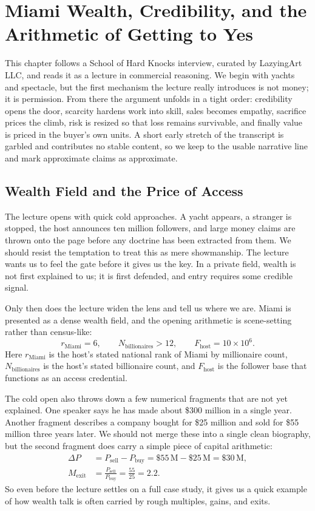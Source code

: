 \chapter{Miami Wealth, Credibility, and the Arithmetic of Getting to Yes}

This chapter follows a School of Hard Knocks interview, curated by LazyingArt LLC, and reads it as a lecture in commercial reasoning. We begin with yachts and spectacle, but the first mechanism the lecture really introduces is not money; it is permission. From there the argument unfolds in a tight order: credibility opens the door, scarcity hardens work into skill, sales becomes empathy, sacrifice prices the climb, risk is resized so that loss remains survivable, and finally value is priced in the buyer's own units. A short early stretch of the transcript is garbled and contributes no stable content, so we keep to the usable narrative line and mark approximate claims as approximate.

\section{Wealth Field and the Price of Access}

The lecture opens with quick cold approaches. A yacht appears, a stranger is stopped, the host announces ten million followers, and large money claims are thrown onto the page before any doctrine has been extracted from them. We should resist the temptation to treat this as mere showmanship. The lecture wants us to feel the gate before it gives us the key. In a private field, wealth is not first explained to us; it is first defended, and entry requires some credible signal.

Only then does the lecture widen the lens and tell us where we are. Miami is presented as a dense wealth field, and the opening arithmetic is scene-setting rather than census-like:
\begin{equation}
r_{\mathrm{Miami}} = 6,
\qquad
N_{\mathrm{billionaires}} > 12,
\qquad
F_{\mathrm{host}} = 10\times 10^{6}.
\end{equation}
Here \(r_{\mathrm{Miami}}\) is the host's stated national rank of Miami by millionaire count, \(N_{\mathrm{billionaires}}\) is the host's stated billionaire count, and \(F_{\mathrm{host}}\) is the follower base that functions as an access credential.

The cold open also throws down a few numerical fragments that are not yet explained. One speaker says he has made about \$300 million in a single year. Another fragment describes a company bought for \$25 million and sold for \$55 million three years later. We should not merge these into a single clean biography, but the second fragment does carry a simple piece of capital arithmetic:
\begin{align}
\Delta P
&= P_{\mathrm{sell}} - P_{\mathrm{buy}}
= \$55\,\mathrm{M} - \$25\,\mathrm{M}
= \$30\,\mathrm{M},\\
M_{\mathrm{exit}}
&= \frac{P_{\mathrm{sell}}}{P_{\mathrm{buy}}}
= \frac{55}{25}
= 2.2.
\end{align}
So even before the lecture settles on a full case study, it gives us a quick example of how wealth talk is often carried by rough multiples, gains, and exits.

